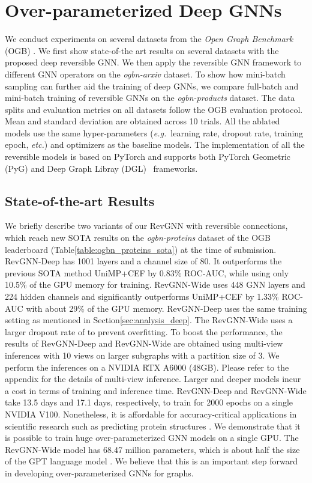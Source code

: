 \documentclass{article}
\newcommand{\eg}{\emph{e.g.~}}
\newcommand{\etc}{\emph{etc.\xspace}}
\newcommand{\secLabel}{Section\xspace}
\newcommand{\tblLabel}{Table\xspace}
\begin{document}
\section{Over-parameterized Deep GNNs}
We conduct experiments on several datasets from the \emph{Open Graph Benchmark} (OGB) \citep{hu2020open}. We first show state-of-the art results on several datasets with the proposed deep reversible GNN. We then apply the reversible GNN framework to different GNN operators on the \emph{ogbn-arxiv} dataset. To show how mini-batch sampling can further aid the training of deep GNNs, we compare full-batch and mini-batch training of reversible GNNs on the \emph{ogbn-products} dataset.
The data splits and evaluation metrics on all datasets follow the OGB evaluation protocol. Mean and standard deviation are obtained across 10 trials. All the ablated models use the same hyper-parameters (\eg learning rate, dropout rate, training epoch, \etc) and optimizers as the baseline models. The implementation of all the reversible models is based on PyTorch \citep{pytorch2019} and supports both PyTorch Geometric (PyG) \citep{Fey/Lenssen/2019} and Deep Graph Libray (DGL)~\citep{wang2019dgl} frameworks.

\subsection{State-of-the-art Results}
We briefly describe two variants of our RevGNN with reversible connections, which reach new SOTA results on the \emph{ogbn-proteins} dataset of the OGB leaderboard \citep{hu2020open} (\tblLabel \ref{table:ogbn_proteins_sota}) at the time of submission. RevGNN-Deep has 1001 layers and a channel size of 80. It outperforms the previous SOTA method UniMP+CEF by 0.83\% ROC-AUC, while using only 10.5\% of the GPU memory for training. RevGNN-Wide uses 448 GNN layers and 224 hidden channels and significantly outperforms UniMP+CEF by 1.33\% ROC-AUC with about 29\% of the GPU memory. RevGNN-Deep uses the same training setting as mentioned in \secLabel \ref{sec:analysis_deep}. The RevGNN-Wide uses a larger dropout rate of  to prevent overfitting. To boost the performance, the results of RevGNN-Deep and RevGNN-Wide are obtained using multi-view inferences with 10 views on larger subgraphs with a partition size of 3. We perform the inferences on a NVIDIA RTX A6000 (48GB). Please refer to the appendix for the details of multi-view inference.
Larger and deeper models incur a cost in terms of training and inference time. RevGNN-Deep and RevGNN-Wide take 13.5 days and 17.1 days, respectively, to train for 2000 epochs on a single NVIDIA V100. Nonetheless, it is affordable for accuracy-critical applications in scientific research such as predicting protein structures \citep{senior2020improved}. We demonstrate that it is possible to train huge over-parameterized GNN models on a single GPU. The RevGNN-Wide model has 68.47 million parameters, which is about half the size of the GPT language model \citep{radford2018improving}. We believe that this is an important step forward in developing over-parameterized GNNs for graphs.
\end{document}
